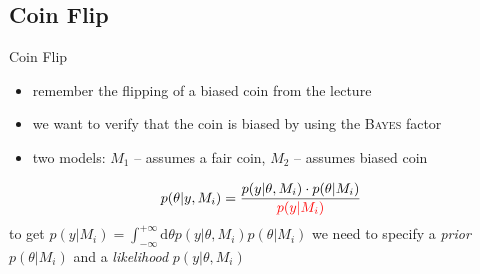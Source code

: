 \documentclass[11pt,aspectratio=1610,dvipsnames]{beamer}
\begin{document}
\subsection{Coin Flip}
\begin{frame}{Coin Flip }
	\begin{itemize}
		\item remember the flipping of a biased coin from the lecture
		\item we want to verify that the coin is biased by using the \textsc{Bayes} factor
		\item two models: $M_1$ -- assumes a fair coin, $M_2$ -- assumes biased coin
	\end{itemize}
	\begin{tcolorbox}[colback=black!5,colframe=gray!15!black,title=Posterior of the coin flip problem]
		\begin{equation}
			p(\theta|y,M_i)=\frac{p(y|\theta,M_i)\cdot p(\theta|M_i)}{\color{red}p(y|M_i)}
		\end{equation}
		to get $p(y|M_i)=\int_{-\infty}^{+\infty}\text{d}{\theta} p(y|{\theta},M_i)p({\theta}|M_i)$ we need to specify a \emph{prior} $p({\theta}|M_i)$ and a \emph{likelihood}  $p(y|{\theta},M_i)$
	\end{tcolorbox}
\end{frame}
\end{document}
